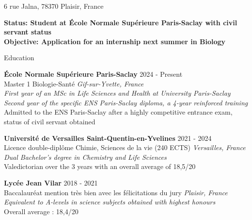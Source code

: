 \documentclass[
	10pt,
]{style} %
\begin{document}
\vspace{-0.25em}

\begin{center}
	6 rue Jalna, 78370 Plaisir, France \\
\end{center}

\begin{center}
	\textbf{Status: Student at École Normale Supérieure Paris-Saclay with civil servant status} \\
	\textbf{Objective: Application for an internship next summer in Biology}
\end{center}


\begin{rSection}{Education}

	\textbf{École Normale Supérieure Paris-Saclay} \hfill 2024 - Present \\
	Master 1 Biologie-Santé \hfill \textit{Gif-sur-Yvette, France} \\
	\textit{First year of an MSc in Life Sciences and Health at University Paris-Saclay} \\
	\textit{Second year of the specific ENS Paris-Saclay diploma, a 4-year reinforced training} \\
	Admitted to the ENS Paris-Saclay after a highly competitive entrance exam, status of civil servant obtained

	\vspace{0.5mm}

	\textbf{Université de Versailles Saint-Quentin-en-Yvelines} \hfill 2021 - 2024 \\
	Licence double-diplôme Chimie, Sciences de la vie (240 ECTS) \hfill \textit{Versailles, France} \\
	\textit{Dual Bachelor's degree in Chemistry and Life Sciences} \\
	Valedictorian over the 3 years with an overall average of 18,5/20

	\vspace{0.5mm}

	\textbf{Lycée Jean Vilar} \hfill 2018 - 2021 \\
	Baccalauréat mention très bien avec les félicitations du jury \hfill \textit{Plaisir, France} \\
	\textit{Equivalent to A-levels in science subjects obtained with highest honours} \\
	Overall average : 18,4/20
\end{rSection}
\end{document}
